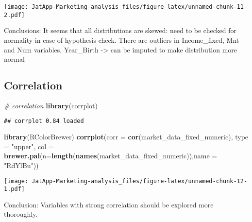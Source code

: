 \documentclass[]{article}
\newenvironment{Shaded}{\begin{snugshade}}{\end{snugshade}}
\newcommand{\CommentTok}[1]{\textcolor[rgb]{0.56,0.35,0.01}{\textit{#1}}}
\newcommand{\DataTypeTok}[1]{\textcolor[rgb]{0.13,0.29,0.53}{#1}}
\newcommand{\KeywordTok}[1]{\textcolor[rgb]{0.13,0.29,0.53}{\textbf{#1}}}
\newcommand{\NormalTok}[1]{#1}
\newcommand{\OperatorTok}[1]{\textcolor[rgb]{0.81,0.36,0.00}{\textbf{#1}}}
\newcommand{\StringTok}[1]{\textcolor[rgb]{0.31,0.60,0.02}{#1}}
\begin{document}
\begin{Shaded}
\end{Shaded}

\texttt{[image: JatApp-Marketing-analysis\_files/figure-latex/unnamed-chunk-11-2.pdf]}

Conclusions: It seems that all distributions are skewed: need to be
checked for normality in case of hypothesis check. There are outliers in
Income\_fixed, Mnt and Num variables, Year\_Birth -\textgreater{} can be
imputed to make distribution more normal

\hypertarget{correlation}{%
\subsection{Correlation}\label{correlation}}

\begin{Shaded}
\begin{Highlighting}[]
\CommentTok{# correlation}
\KeywordTok{library}\NormalTok{(corrplot)}
\end{Highlighting}
\end{Shaded}

\begin{verbatim}
## corrplot 0.84 loaded
\end{verbatim}

\begin{Shaded}
\begin{Highlighting}[]
\KeywordTok{library}\NormalTok{(RColorBrewer)}
\KeywordTok{corrplot}\NormalTok{(}\DataTypeTok{corr =} \KeywordTok{cor}\NormalTok{(market_data_fixed_numeric),}
         \DataTypeTok{type =} \StringTok{"upper"}\NormalTok{,}
         \DataTypeTok{col =} \KeywordTok{brewer.pal}\NormalTok{(}\DataTypeTok{n=}\KeywordTok{length}\NormalTok{(}\KeywordTok{names}\NormalTok{(market_data_fixed_numeric)),}\DataTypeTok{name =} \StringTok{"RdYlBu"}\NormalTok{))}
\end{Highlighting}
\end{Shaded}

\texttt{[image: JatApp-Marketing-analysis\_files/figure-latex/unnamed-chunk-12-1.pdf]}

Conclusion: Variables with strong correlation should be explored more
thoroughly.
\end{document}
